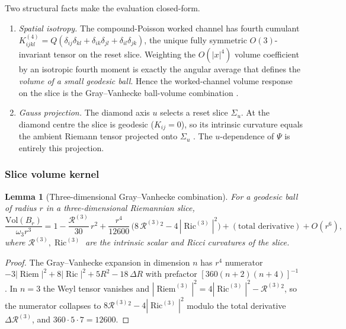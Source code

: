 \documentclass[11pt]{article}
\newtheorem{lemma}[theorem]{Lemma}
\theoremstyle{definition}
\theoremstyle{remark}
\newcommand{\Ric}{\operatorname{Ric}}
\newcommand{\Riem}{\operatorname{Riem}}
\newcommand{\Rth}{\mathcal R^{(3)}}
\begin{document}
Two structural facts make the evaluation closed-form.

\begin{enumerate}[leftmargin=1.7em]
\item \emph{Spatial isotropy.}  The compound-Poisson worked channel has fourth
cumulant $K^{(4)}_{ijkl}=Q(\delta_{ij}\delta_{kl}+\delta_{ik}\delta_{jl}
+\delta_{il}\delta_{jk})$, the unique fully symmetric $O(3)$-invariant tensor on the
reset slice.  Weighting the $O(|x|^4)$ volume coefficient by an isotropic fourth
moment is exactly the angular average that defines the \emph{volume of a small
geodesic ball}.  Hence the worked-channel volume response on the slice is the
Gray--Vanhecke ball-volume combination \cite{GrayVanhecke,Gray}.
\item \emph{Gauss projection.}  The diamond axis $u$ selects a reset slice
$\Sigma_u$.  At the diamond centre the slice is geodesic ($K_{ij}=0$), so its
intrinsic curvature equals the ambient Riemann tensor projected onto $\Sigma_u$
\cite{Besse}.  The $u$-dependence of $\Psi$ is entirely this projection.
\end{enumerate}

\subsubsection{Slice volume kernel}
\label{subsec:worked-kernel}

\begin{lemma}[Three-dimensional Gray--Vanhecke combination]
\label{lem:gv-three}
For a geodesic ball of radius $r$ in a three-dimensional Riemannian slice,
\[
 \frac{\mathrm{Vol}(B_r)}{\omega_3 r^3}
 =1-\frac{\Rth}{30}\,r^2
 +\frac{r^4}{12600}\,\bigl(8\,\Rth{}^2-4\,|\Ric^{(3)}|^2\bigr)
 +(\text{total derivative})+O(r^6),
\]
where $\Rth,\Ric^{(3)}$ are the intrinsic scalar and Ricci curvatures of the slice.
\end{lemma}

\begin{proof}
The Gray--Vanhecke expansion in dimension $n$ has $r^4$ numerator
$-3|\Riem|^2+8|\Ric|^2+5R^2-18\,\Delta R$ with prefactor
$[360(n+2)(n+4)]^{-1}$ \cite{GrayVanhecke,Gray}.  In $n=3$ the Weyl tensor
vanishes and $|\Riem^{(3)}|^2=4|\Ric^{(3)}|^2-\Rth{}^2$, so the numerator collapses
to $8\Rth{}^2-4|\Ric^{(3)}|^2$ modulo the total derivative $\Delta\Rth$, and
$360\cdot5\cdot7=12600$.
\end{proof}
\end{document}
